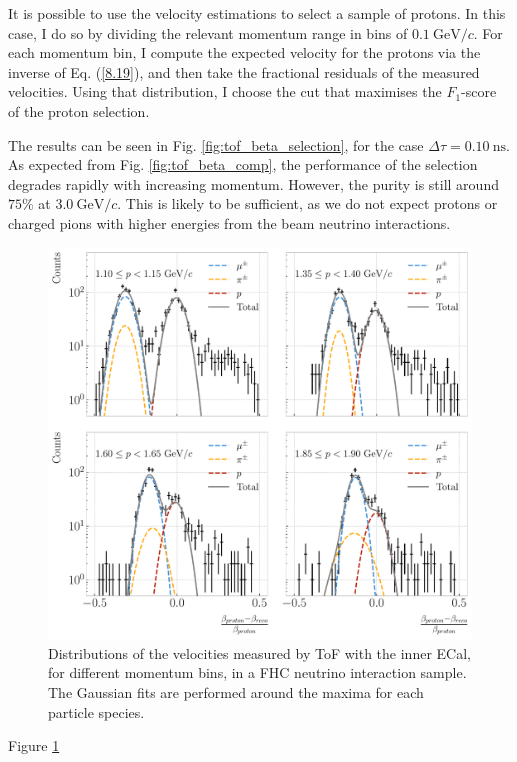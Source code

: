 It is possible to use the velocity estimations to select a sample of protons. In this case, I do so by dividing the relevant momentum range in bins of $0.1~\mathrm{GeV}/c$. For each momentum bin, I compute the expected velocity for the protons via the inverse of Eq. (\ref{8.19}), and then take the fractional residuals of the measured velocities. Using that distribution, I choose the cut that maximises the $F_{1}$-score of the proton selection.

The results can be seen in Fig. \ref{fig:tof_beta_selection}, for the case $\Delta \tau = 0.10 ~ \mathrm{ns}$. As expected from Fig. \ref{fig:tof_beta_comp}, the performance of the selection degrades rapidly with increasing momentum. However, the purity is still around $75\%$ at $3.0~\mathrm{GeV}/c$. This is likely to be sufficient, as we do not expect protons or charged pions with higher energies from the beam neutrino interactions.

\begin{figure}[t]
	\centering
	\includegraphics[width=.95\linewidth]{Images/GArSoft_PID/tof/numu_cc_proton_tof_summary.pdf}
	\caption{Distributions of the velocities measured by ToF with the
	inner ECal, for different momentum bins, in a FHC neutrino interaction sample. The Gaussian fits are performed around the maxima for each particle species.}
	\label{fig:tof_beta_fhc}
\end{figure}

Figure \ref{fig:tof_beta_fhc}

